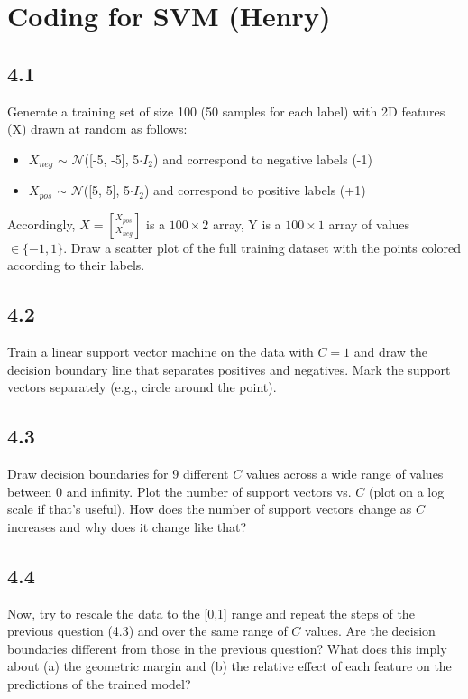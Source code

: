 \documentclass{exam}
\begin{document}
\section{Coding for SVM (Henry)}

\subsection*{4.1}

Generate a training set of size 100 (50 samples for each label) with 2D features (X) drawn at random as follows:
\begin{itemize}
\item $X_{neg}$ $\sim$ $\mathcal{N}$([-5, -5], 5$\cdot I_2$) and correspond to negative labels (-1)
\item $X_{pos}$ $\sim$ $\mathcal{N}$([5, 5], 5$\cdot I_2$) and correspond to positive labels (+1)
\end{itemize} 
Accordingly, $X = [_{X_{neg}}^{X_{pos}}]$ is a $100\times2$ array, Y is a $100\times1$ array of values $\in \{-1, 1\}$.  Draw a scatter plot of the full training dataset with the points colored according to their labels.

\subsection*{4.2}

Train a linear support vector machine on the data with $C=1$ and draw the decision boundary line that separates positives and negatives. Mark the support vectors separately (e.g., circle around the point). 

\subsection*{4.3}

Draw decision boundaries for 9 different $C$ values across a wide range of values between 0 and infinity.
Plot the number of support vectors vs. $C$ (plot on a log scale if that's useful).
How does the number of support vectors change as $C$ increases and why does it change like that? 

\subsection*{4.4}

Now, try to rescale the data to the [0,1] range and repeat the steps of the previous question (4.3) and over the same range of $C$ values. Are the decision boundaries different from those in the previous question? What does this imply about (a) the geometric margin and (b) the relative effect of each feature on the predictions of the trained model?
\end{document}
